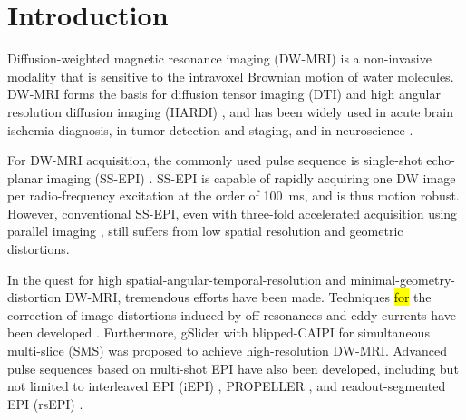 \documentclass[preprint,12pt,authoryear,review]{elsarticle}
\begin{document}
    \pagebreak
    \linenumbers

    \section{Introduction}
    \label{SEC:Intr}

    Diffusion-weighted magnetic resonance imaging (DW-MRI)
    \citep{lebihan_1986_diff,merboldt_1985_diff} is a non-invasive modality
    that is sensitive to the intravoxel Brownian motion of water molecules.
    DW-MRI forms the basis for diffusion tensor imaging (DTI) \citep{basser_1994_dmri,mori_2001_track}
    and high angular resolution diffusion imaging (HARDI) \citep{tuch_2002_hardi},
    and has been widely used in acute brain ischemia diagnosis, in tumor detection and staging,
    and in neuroscience \citep{jones_2010_diff}.

    For DW-MRI acquisition, the commonly used pulse sequence is
    single-shot echo-planar imaging (SS-EPI) \citep{mansfield_1977_epi}.
    SS-EPI is capable of rapidly acquiring one DW image per radio-frequency excitation
    at the order of \SI{100}{\ms}, and is thus motion robust.
    However, conventional SS-EPI,
    even with three-fold accelerated acquisition \citep{bammer_2001_epi_sense}
    using parallel imaging
    \citep{roemer_1990_pi,ra_1993_sense,pruessmann_1999_sense,griswold_2002_grappa},
    still suffers from low spatial resolution and geometric distortions.

    In the quest for high spatial-angular-temporal-resolution
    and minimal-geometry-distortion DW-MRI,
    tremendous efforts have been made.
    Techniques \hl{for} the correction of image distortions
    induced by off-resonances and eddy currents
    have been developed \citep{andersson_2003_topup}.
    Furthermore, gSlider \citep{setsompop_2018_gslider} with
    blipped-CAIPI \citep{setsompop_2012_blipped}
    for simultaneous multi-slice (SMS)
    \citep{maudsley_1980_sms,breuer_2005_caipi}
    was proposed to achieve high-resolution DW-MRI.
    Advanced pulse sequences based on
    multi-shot EPI have also been developed,
    including but not limited to interleaved EPI (iEPI)
    \citep{butts_1993_iepi},
    PROPELLER \citep{pipe_2002_blade}, and
    readout-segmented EPI (rsEPI)
    \citep{porter_2009_resolve,heidemann_2010_resolve7t}.
\end{document}

